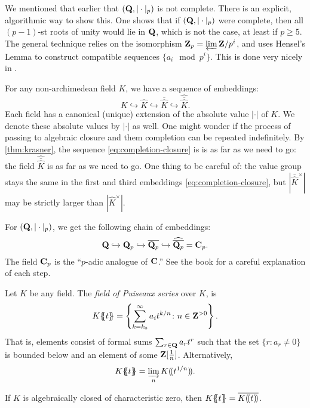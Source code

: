 We mentioned that earlier that $(\mathbf{Q},|\cdot|_p)$ is not complete. There is an 
explicit, algorithmic way to show this. One shows that if $(\mathbf{Q},|\cdot|_p)$ 
were complete, then all $(p-1)$-st roots of unity would lie in $\mathbf{Q}$, which is 
not the case, at least if $p\geqslant 5$. The general technique relies on the 
isomorphism $\mathbf{Z}_p=\varprojlim \mathbf{Z}/p^i$, and uses Hensel's Lemma to construct 
compatible sequences $\{a_i\mod{p^i}\}$. This is done very nicely in 
\cite[3.2.3]{gouvea-1997}. 

For any non-archimedean field $K$, we have a sequence of embeddings:
\begin{equation}\label{eq:completion-closure}
  K \hookrightarrow 
  \widehat K \hookrightarrow 
  \overline{\widehat K} \hookrightarrow 
  \widehat{\overline{\widehat K}} .
\end{equation}
Each field has a canonical (unique) extension of the absolute value $|\cdot|$ 
of $K$. We denote these absolute values by $|\cdot|$ as well. One might wonder 
if the process of passing to algebraic closure and them completion can be 
repeated indefinitely. By \autoref{thm:krasner}, the sequence 
\eqref{eq:completion-closure} is is as far as we need to go: the field 
$\widehat{\overline{\widehat K}}$ is as far as we need to go. One thing to be 
careful of: the value group stays the same in the first and third embeddings 
\eqref{eq:completion-closure}, but 
$|\overline{\widehat K}^\times|$ may be strictly larger than 
$|\widehat K^\times|$. 

\begin{example}
For $(\mathbf{Q},|\cdot|_p)$, we get the following chain of embeddings:
\[
  \mathbf{Q}\hookrightarrow \mathbf{Q}_p \hookrightarrow \overline{\mathbf{Q}_p} \hookrightarrow \widehat{\overline{\mathbf{Q}_p}} = \mathbf{C}_p .
\]
The field $\mathbf{C}_p$ is the ``$p$-adic analogue of $\mathbf{C}$.'' See the book 
\cite{koblitz-1984} for a careful explanation of each step. 
\end{example}

\begin{definition}
Let $K$ be any field. The \emph{field of Puiseaux series} over $K$, is 
\[
  K\{\!\!\{t\}\!\!\} = \left\{\sum_{k=k_0}^\infty a_i t^{k/n}\colon n\in \mathbf{Z}^{>0}\right\} .
\]
That is, elements consist of formal sums $\sum_{r\in \mathbf{Q}} a_r t^r$ such that 
the set $\{r\colon a_r\ne 0\}$ is bounded below and an element of some 
$\mathbf{Z}[\frac 1 n]$. Alternatively, 
\[
  K\{\!\!\{t\}\!\!\} = \varinjlim_n K(\!( t^{1/n})\!) .
\]
\end{definition}

\begin{theorem}[Newton]
If $K$ is algebraically closed of characteristic zero, then 
$K\{\!\!\{t\}\!\!\} = \overline{K(\!( t)\!)}$. 
\end{theorem}


